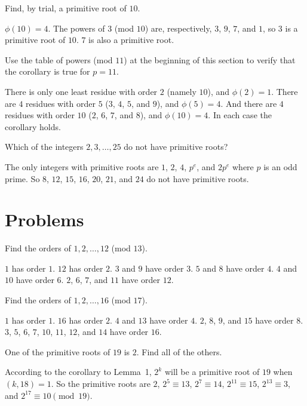  Find, by trial, a primitive root of $10$.
\begin{solution}
  $\phi(10) = 4$. The powers of $3$ (mod $10$) are, respectively, $3$,
  $9$, $7$, and $1$, so $3$ is a primitive root of $10$. $7$ is also a
  primitive root.
\end{solution}

 Use the table of powers (mod $11$) at the beginning of this
section to verify that the corollary is true for $p = 11$.
\begin{solution}
  There is only one least residue with order $2$ (namely $10$), and
  $\phi(2) = 1$. There are $4$ residues with order $5$ ($3$, $4$, $5$,
  and $9$), and $\phi(5) = 4$. And there are $4$ residues with order
  $10$ ($2$, $6$, $7$, and $8$), and $\phi(10) = 4$. In each case the
  corollary holds.
\end{solution}

 Which of the integers $2, 3, \dots, 25$ do not have
primitive roots?
\begin{solution}
  The only integers with primitive roots are $1$, $2$, $4$, $p^e$, and
  $2p^e$ where $p$ is an odd prime. So $8$, $12$, $15$, $16$, $20$,
  $21$, and $24$ do not have primitive roots.
\end{solution}

\section{Problems}

 Find the orders of $1, 2, \dots, 12$ (mod $13$).
\begin{solution}
  $1$ has order $1$. $12$ has order $2$. $3$ and $9$ have order
  $3$. $5$ and $8$ have order $4$. $4$ and $10$ have order $6$. $2$,
  $6$, $7$, and $11$ have order $12$.
\end{solution}

 Find the orders of $1, 2, \dots, 16$ (mod $17$).
\begin{solution}
  $1$ has order $1$. $16$ has order $2$. $4$ and $13$ have order
  $4$. $2$, $8$, $9$, and $15$ have order $8$. $3$, $5$, $6$, $7$,
  $10$, $11$, $12$, and $14$ have order $16$.
\end{solution}

 One of the primitive roots of $19$ is $2$. Find all of the
others.
\begin{solution}
  According to the corollary to Lemma~1, $2^k$ will be a primitive
  root of $19$ when $(k,18) = 1$. So the primitive roots are $2$,
  $2^5\equiv13$, $2^7\equiv14$, $2^{11}\equiv15$, $2^{13}\equiv3$, and
  $2^{17}\equiv10\pmod{19}$.
\end{solution}

